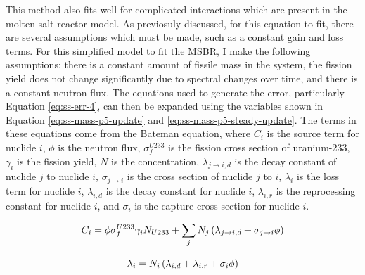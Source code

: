 This method also fits well for complicated interactions which are present in the molten salt reactor model.
As previosuly discussed, for this equation to fit, there are several assumptions which must be made, such as a constant gain and loss terms.
For this simplified model to fit the MSBR, I make the following assumptions: there is a constant amount of fissile mass in the system, the fission yield does not change significantly due to spectral changes over time, and there is a constant neutron flux.
The equations used to generate the error, particularly Equation \eqref{eq:ss-err-4}, can then be expanded using the variables shown in Equation \eqref{eq:ss-mass-p5-update} and \eqref{eq:ss-mass-p5-steady-update}. The terms in these equations come from the Bateman equation, where $C_i$ is the source term for nuclide $i$, $\phi$ is the neutron flux, $\sigma^{U233}_f$ is the fission cross section of uranium-233, $\gamma_i$ is the fission yield, $N$ is the concentration, $\lambda_{j \rightarrow i, d }$ is the decay constant of nuclide $j$ to nuclide $i$, $\sigma_{j \rightarrow i}$ is the cross section of nuclide $j$ to $i$, $\lambda_i$ is the loss term for nuclide $i$, $\lambda_{i, d}$ is the decay constant for nuclide $i$, $\lambda_{i, r}$ is the reprocessing constant for nuclide $i$, and $\sigma_i$ is the capture cross section for nuclide $i$.

\begin{equation} \hfill 
C_i = \phi \sigma^{U233}_f \gamma_i N_{U233} + \sum_j N_j \left( \lambda_{j \rightarrow i, d }  + \sigma_{j \rightarrow i} \phi \right)
\hfill\label{eq:ss-mass-p5-update} \end{equation}

\begin{equation} \hfill 
\lambda_i = N_i \left( \lambda_{i, d} + \lambda_{i, r} + \sigma_i \phi \right)
\hfill\label{eq:ss-mass-p5-steady-update} \end{equation}

